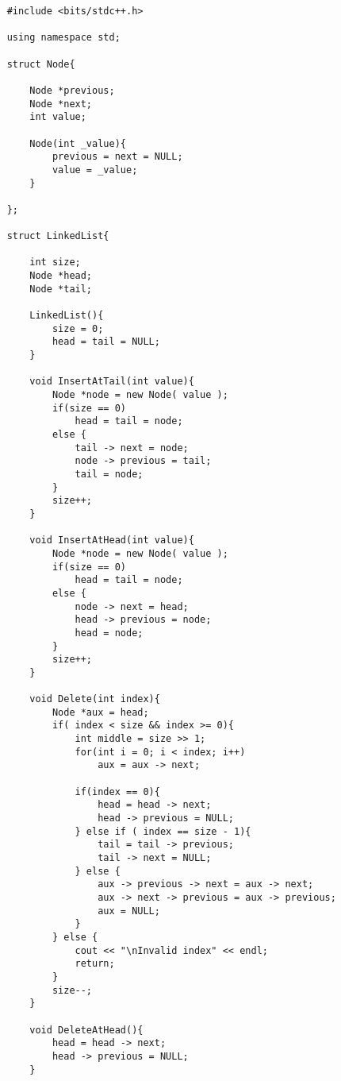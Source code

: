 \begin{lstlisting}
    #include <bits/stdc++.h>

    using namespace std;

    struct Node{

        Node *previous;
        Node *next;
        int value;

        Node(int _value){
            previous = next = NULL;
            value = _value;
        }

    };

    struct LinkedList{

        int size;
        Node *head;
        Node *tail;

        LinkedList(){
            size = 0;
            head = tail = NULL;
        }

        void InsertAtTail(int value){
            Node *node = new Node( value );
            if(size == 0)
                head = tail = node;
            else {
                tail -> next = node;
                node -> previous = tail;
                tail = node;
            }
            size++;
        }

        void InsertAtHead(int value){
            Node *node = new Node( value );
            if(size == 0)
                head = tail = node;
            else {
                node -> next = head;
                head -> previous = node;
                head = node;
            }
            size++;
        }

        void Delete(int index){
            Node *aux = head;
            if( index < size && index >= 0){
                int middle = size >> 1;
                for(int i = 0; i < index; i++)
                    aux = aux -> next;
                
                if(index == 0){
                    head = head -> next;
                    head -> previous = NULL;
                } else if ( index == size - 1){
                    tail = tail -> previous;
                    tail -> next = NULL;
                } else {    
                    aux -> previous -> next = aux -> next;
                    aux -> next -> previous = aux -> previous;
                    aux = NULL;
                }
            } else {
                cout << "\nInvalid index" << endl;
                return;
            }
            size--;
        }

        void DeleteAtHead(){
            head = head -> next;
            head -> previous = NULL;
        }


\end{lstlisting}
